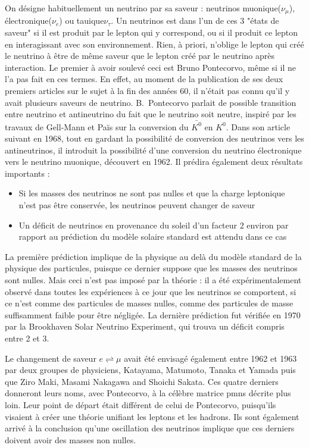             On désigne habituellement un neutrino par sa saveur : neutrinos muonique($\nu_{\mu}$), électronique($\nu_e$) ou tauique$\nu_{\tau}$. Un neutrinos est dans l'un de ces 3 "états de saveur" si il est produit par le lepton qui y correspond, ou si il produit ce lepton en interagissant avec son environnement. Rien, à priori, n'oblige le lepton qui créé le neutrino à être de même saveur que le lepton créé par le neutrino après interaction. Le premier à avoir soulevé ceci est Bruno Pontecorvo, même si il ne l'a pas fait en ces termes. En effet, au moment de la publication de ses deux premiers articles\cite{Pontecorvo:1957cp,Pontecorvo:1957qd} sur le sujet à la fin des années 60, il n'était pas connu qu'il y avait plusieurs saveurs de neutrino. B.~Pontecorvo parlait de possible transition entre neutrino et antineutrino du fait que le neutrino soit neutre, inspiré par les travaux de Gell-Mann et Païs\cite{Gell-Mann1955} sur la conversion du $\bar{K^0}$ en  $K^0$. Dans son article suivant en 1968\cite{Pontercorvo1968}, tout en gardant la possibilité de conversion des neutrinos vers les antineutrinos, il introduit la possibilité d'une conversion du neutrino électronique vers le neutrino muonique, découvert en 1962\cite{Danby1962}. Il prédira également deux résultats importants :
            \begin{itemize}
                \item Si les masses des neutrinos ne sont pas nulles et que la charge leptonique n'est pas être conservée, les neutrinos peuvent changer de saveur
                \item Un déficit de neutrinos en provenance du soleil d'un facteur 2 environ par rapport au prédiction du modèle solaire standard est attendu dans ce cas
            \end{itemize}
            La première prédiction implique de la physique au delà du modèle standard de la physique des particules, puisque ce dernier suppose que les masses des neutrinos sont nulles. Mais ceci n'est pas imposé par la théorie : il a été expérimentalement observé dans toutes les expériences à ce jour que les neutrinos se comportent, si ce n'est comme des particules de masses nulles, comme des particules de masse suffisamment faible pour être négligée. 
            La dernière prédiction fut vérifiée en 1970 par la Brookhaven Solar Neutrino Experiment\cite{Bahcall1976}, qui trouva un déficit compris entre 2 et 3.
            
            Le changement de saveur $e\rightleftharpoons\mu$ avait été envisagé également entre 1962 et 1963 par deux groupes de physiciens, Katayama, Matumoto, Tanaka et Yamada\cite{Nakagawa1963} puis que Ziro Maki, Masami Nakagawa and Shoichi Sakata\cite{Maki1962}. Ces quatre derniers donneront leurs noms, avec Pontecorvo, à la célèbre matrice \gls{pmns} décrite plus loin. Leur point de départ était différent de celui de Pontecorvo, puisqu'ils visaient à créer une théorie unifiant les leptons et les hadrons. Ils sont également arrivé à la conclusion qu'une oscillation des neutrinos implique que ces derniers doivent avoir des masses non nulles.
    
